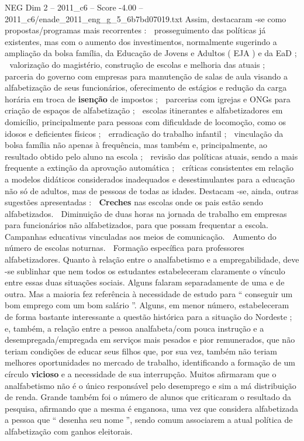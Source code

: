 \begin{textsample}{NEG Dim 2 – 2011\_c6 – Score -4.00 – 2011\_c6/enade\_2011\_eng\_g\_5\_6b7bd07019.txt}
Assim, destacaram -se como propostas/programas mais recorrentes :  prosseguimento das políticas já existentes, mas com o aumento dos investimentos, normalmente sugerindo a ampliação da bolsa família, da Educação de Jovens e Adultos ( EJA ) e da EaD ;  valorização do magistério, construção de escolas e melhoria das atuais ;  parceria do governo com empresas para manutenção de salas de aula visando a alfabetização de seus funcionários, oferecimento de estágios e redução da carga horária em troca de \textbf{isenção} de impostos ;  parcerias com igrejas e ONGs para criação de espaços de alfabetização ;  escolas itinerantes e alfabetizadores em domicílio, principalmente para pessoas com dificuldade de locomoção, como os idosos e deficientes físicos ;  erradicação do trabalho infantil ;  vinculação da bolsa família não apenas à frequência, mas também e, principalmente, ao resultado obtido pelo aluno na escola ;  revisão das políticas atuais, sendo a mais frequente a extinção da aprovação automática ;  críticas consistentes em relação a modelos didáticos considerados inadequados e desestimulantes para a educação não só de adultos, mas de pessoas de todas as idades.
Destacam -se, ainda, outras sugestões apresentadas :  \textbf{Creches} nas escolas onde os pais estão sendo alfabetizados.  Diminuição de duas horas na jornada de trabalho em empresas para funcionários não alfabetizados, para que possam frequentar a escola.  Campanhas educativas vinculadas aos meios de comunicação.  Aumento do número de escolas noturnas.  Formação específica para professores alfabetizadores.
Quanto à relação entre o analfabetismo e a empregabilidade, deve -se sublinhar que nem todos os estudantes estabeleceram claramente o vínculo entre essas duas situações sociais.
Alguns falaram separadamente de uma e de outra.
Mas a maioria fez referência à necessidade de estudo para “ conseguir um bom emprego com um bom salário ”.
Alguns, em menor número, estabeleceram de forma bastante interessante a questão histórica para a situação do Nordeste ; e, também, a relação entre a pessoa analfabeta/com pouca instrução e a desempregada/empregada em serviços mais pesados e pior remunerados, que não teriam condições de educar seus filhos que, por sua vez, também não teriam melhores oportunidades no mercado de trabalho, identificando a formação de um círculo \textbf{vicioso} e a necessidade de sua interrupção.
Muitos afirmaram que o analfabetismo não é o único responsável pelo desemprego e sim a má distribuição de renda.
Grande também foi o número de alunos que criticaram o resultado da pesquisa, afirmando que a mesma é enganosa, uma vez que considera alfabetizada a pessoa que “ desenha seu nome ”, sendo comum associarem a atual política de alfabetização com ganhos eleitorais.

\end{textsample}
